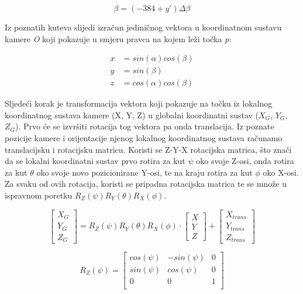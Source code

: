 \documentclass[times, utf8, diplomski]{fer}
\begin{document}
\begin{equation}
\beta = (-384 + y')\Delta\beta
\label{eq:beta}
\end{equation}

\vspace{5mm}

Iz poznatih kuteva slijedi izračun jediničnog vektora u koordinatnom sustavu kamere \textit{O} koji pokazuje u smjeru pravca na kojem leži točka \textit{p}:

\begin{align}
x &= sin(\alpha)cos(\beta) \\
y &= sin(\beta) \\
z &= cos(\alpha)cos(\beta)
\end{align}

\vspace{5mm}

Sljedeći korak je transformacija vektora koji pokazuje na točku iz lokalnog koordinatnog sustava kamere (X, Y, Z) u globalni koordinatni sustav ($X_G$, $Y_G$, $Z_G$). Prvo će se izvršiti rotacija tog vektora pa onda translacija. Iz poznate pozicije kamere i orijentacije njenog lokalnog koordinatnog sustava računamo translacijsku i rotacijsku matricu. Koristi se Z-Y-X rotacijska matrica, što znači da se lokalni koordinatni sustav prvo rotira za kut $\psi$ oko svoje Z-osi, onda rotira za kut $\theta$ oko svoje novo pozicionirane Y-osi, te na kraju rotira za kut $\phi$ oko X-osi. Za svaku od ovih rotacija, koristi se pripadna rotacijska matrica te se množe u ispravnom poretku $R_{Z}(\psi)R_{Y}(\theta)R_{X}(\phi)$.

\begin{equation}
	\begin{bmatrix}
		X_G \\
		Y_G \\
		Z_G
	\end{bmatrix}
	= R_{Z}(\psi)R_{Y}(\theta)R_{X}(\phi)\cdot
	\begin{bmatrix}
		X \\
		Y \\
		Z 
	\end{bmatrix}
	+ \begin{bmatrix}
		X_{trans} \\
		Y_{trans} \\
		Z_{trans} 
	\end{bmatrix}
\end{equation}

\begin{equation}
	R_{Z}(\psi) = 
	\begin{bmatrix}
		cos(\psi) & -sin(\psi) & 0 \\
		sin(\psi) & cos(\psi) & 0 \\
		0 & 0 & 1 \\
	\end{bmatrix}
\end{equation}
\end{document}
